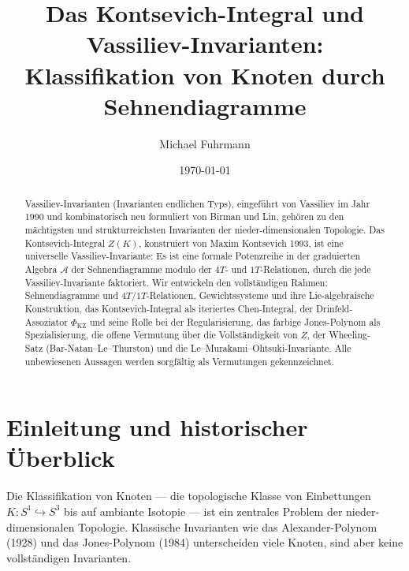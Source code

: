 \documentclass[12pt,a4paper]{amsart}
\theoremstyle{definition}
\begin{document}

\title{Das Kontsevich-Integral und Vassiliev-Invarianten:\\
       Klassifikation von Knoten durch Sehnendiagramme}

\author{Michael Fuhrmann}
\address{Specialist Mathematics Project, Build 170}
\date{\today}

\begin{abstract}
Vassiliev-Invarianten (Invarianten endlichen Typs), eingeführt von Vassiliev
im Jahr 1990 und kombinatorisch neu formuliert von Birman und Lin, gehören zu den
mächtigsten und strukturreichsten Invarianten der nieder-dimensionalen Topologie.
Das Kontsevich-Integral $Z(K)$, konstruiert von Maxim Kontsevich 1993, ist eine
universelle Vassiliev-Invariante: Es ist eine formale Potenzreihe in der graduierten
Algebra $\mathcal{A}$ der Sehnendiagramme modulo der $4T$- und $1T$-Relationen,
durch die jede Vassiliev-Invariante faktoriert.  Wir entwickeln den vollständigen
Rahmen: Sehnendiagramme und $4T/1T$-Relationen, Gewichtssysteme und ihre
Lie-algebraische Konstruktion, das Kontsevich-Integral als iteriertes Chen-Integral,
der Drinfeld-Assoziator $\Phi_{\mathrm{KZ}}$ und seine Rolle bei der Regularisierung,
das farbige Jones-Polynom als Spezialisierung, die offene Vermutung über die
Vollständigkeit von $Z$, der Wheeling-Satz (Bar-Natan--Le--Thurston) und die
Le--Murakami--Ohtsuki-Invariante.  Alle unbewiesenen Aussagen werden sorgfältig
als Vermutungen gekennzeichnet.
\end{abstract}

\maketitle

\tableofcontents

\section{Einleitung und historischer Überblick}

Die Klassifikation von Knoten --- die topologische Klasse von Einbettungen
$K: S^1 \hookrightarrow S^3$ bis auf ambiante Isotopie --- ist ein zentrales
Problem der nieder-dimensionalen Topologie.  Klassische Invarianten wie das
Alexander-Polynom (1928) und das Jones-Polynom (1984) unterscheiden viele
Knoten, sind aber keine vollständigen Invarianten.
\end{document}
